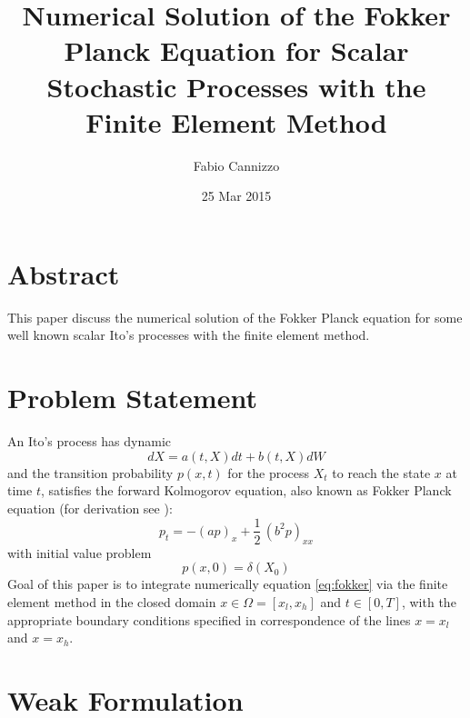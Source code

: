\documentclass[10pt]{article}
\title{Numerical Solution of the Fokker Planck Equation for Scalar Stochastic Processes with the Finite Element Method}
\author{Fabio Cannizzo}
\date{25 Mar 2015}
\begin{document}
\maketitle

\section{Abstract}
\label{sec:abstract}

This paper discuss the numerical solution of the Fokker Planck equation for some well known scalar Ito's processes with the finite element method.

\section{Problem Statement}
\label{sec:process}

An Ito's process has dynamic
\begin{equation}
\label{eq:model}
   dX = a(t,X) dt + b(t,X) dW
\end{equation}
and the transition probability $p(x,t)$ for the process ${X_t}$ to reach the state $x$ at time $t$, satisfies the forward Kolmogorov equation, also known as Fokker Planck equation (for derivation see \cite{shreve}):
\begin{equation}
\label{eq:fokker}
    p_t=  -(ap)_x+\frac{1}{2}  \, (b^2p)_{xx}
\end{equation}
with initial value problem
\begin{equation}
\label{eq:ivp}
    p(x,0)=\delta(X_0)
\end{equation}
Goal of this paper is to integrate numerically equation \eqref{eq:fokker} via the finite element method in the closed domain $x \in \Omega=[x_l,x_h]$ and $t \in [0,T]$, with the appropriate boundary conditions specified in correspondence of the lines $x=x_l$ and $x=x_h$.

\section{Weak Formulation}
\label{sec:weakform}
\end{document}
